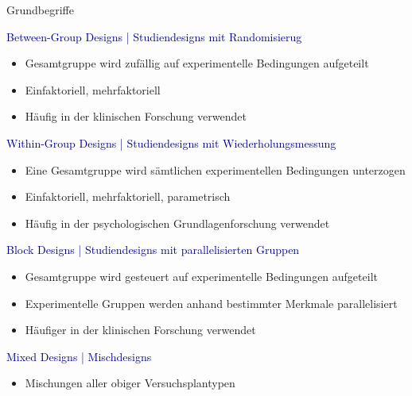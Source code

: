 \documentclass[
  8pt,
  ignorenonframetext,
]{beamer}
\providecommand{\tightlist}{%
  \setlength{\itemsep}{0pt}\setlength{\parskip}{0pt}}
\begin{document}
\begin{frame}{Grundbegriffe}
\protect\hypertarget{grundbegriffe-6}{}

\textcolor{darkblue}{Between-Group Designs | Studiendesigns mit Randomisierug}

\begin{itemize}
\tightlist
\item
  \small Gesamtgruppe wird zufällig auf experimentelle Bedingungen
  aufgeteilt
\item
  Einfaktoriell, mehrfaktoriell
\item
  Häufig in der klinischen Forschung verwendet
\end{itemize}

\textcolor{darkblue}{Within-Group Designs | Studiendesigns mit Wiederholungsmessung}

\begin{itemize}
\tightlist
\item
  \small Eine Gesamtgruppe wird sämtlichen experimentellen Bedingungen
  unterzogen
\item
  Einfaktoriell, mehrfaktoriell, parametrisch
\item
  Häufig in der psychologischen Grundlagenforschung verwendet
\end{itemize}

\textcolor{darkblue}{Block Designs | Studiendesigns mit parallelisierten Gruppen}

\begin{itemize}
\tightlist
\item
  \small Gesamtgruppe wird gesteuert auf experimentelle Bedingungen
  aufgeteilt
\item
  Experimentelle Gruppen werden anhand bestimmter Merkmale
  parallelisiert
\item
  Häufiger in der klinischen Forschung verwendet
\end{itemize}

\textcolor{darkblue}{Mixed Designs | Mischdesigns}

\begin{itemize}
\tightlist
\item
  \small Mischungen aller obiger Versuchsplantypen
\end{itemize}
\end{frame}
\end{document}
